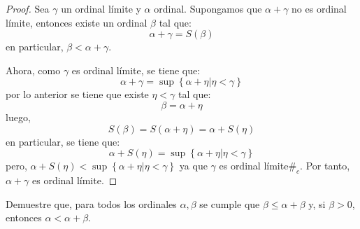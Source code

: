 \documentclass[12pt]{report}
\newcounter{it}
\theoremstyle{largebreak}
\newcommand\contradiction{\ensuremath{\#_c}}
\begin{document}
    \begin{proof}
        Sea $\gamma$ un ordinal límite y $\alpha$ ordinal. Supongamos que $\alpha+\gamma$ no es ordinal límite, entonces existe un ordinal $\beta$ tal que:
        \begin{equation*}
            \alpha+\gamma=S(\beta)
        \end{equation*}
        en particular, $\beta<\alpha+\gamma$.

        Ahora, como $\gamma$ es ordinal límite, se tiene que:
        \begin{equation*}
            \alpha+\gamma=\sup\left\{\alpha+\eta\Big|\eta<\gamma \right\}
        \end{equation*}
        por lo anterior se tiene que existe $\eta<\gamma$ tal que:
        \begin{equation*}
            \beta=\alpha+\eta
        \end{equation*}
        luego,
        \begin{equation*}
            S(\beta)=S(\alpha+\eta)=\alpha+S(\eta)
        \end{equation*}
        en particular, se tiene que:
        \begin{equation*}
            \alpha+S(\eta)=\sup\left\{\alpha+\eta\Big|\eta<\gamma \right\}
        \end{equation*}
        pero, $\alpha+S(\eta)<\sup\left\{\alpha+\eta\Big|\eta<\gamma \right\}$ ya que $\gamma$ es ordinal límite\contradiction. Por tanto, $\alpha+\gamma$ es ordinal límite.
    \end{proof}

    \begin{excer}
        Demuestre que, para todos los ordinales $\alpha,\beta$ se cumple que $\beta\leq\alpha+\beta$ y, si $\beta>0$, entonces $\alpha<\alpha+\beta$.
    \end{excer}
\end{document}
